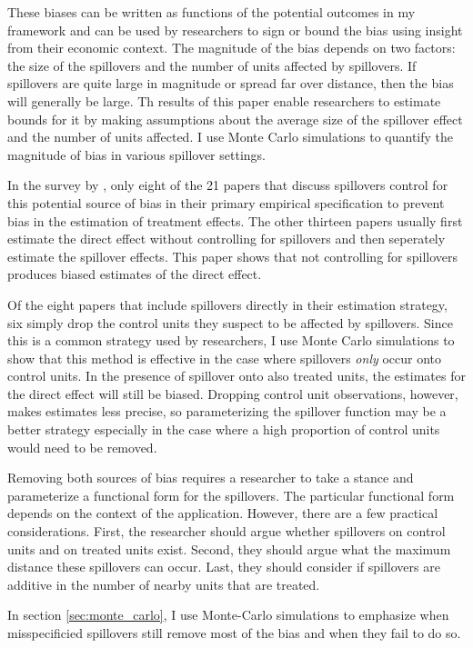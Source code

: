 \documentclass[11pt]{article}
\begin{document}
These biases can be written as functions of the potential outcomes in my framework and can be used by researchers to sign or bound the bias using insight from their economic context. The magnitude of the bias depends on two factors: the size of the spillovers and the number of units affected by spillovers. If spillovers are quite large in magnitude or spread far over distance, then the bias will generally be large. Th results of this paper enable researchers to estimate bounds for it by making assumptions about the average size of the spillover effect and the number of units affected. I use Monte Carlo simulations to quantify the magnitude of bias in various spillover settings.

In the survey by \citet{Berg_Streitz_2019}, only eight of the 21 papers that discuss spillovers control for this potential source of bias in their primary empirical specification to prevent bias in the estimation of treatment effects. The other thirteen papers usually first estimate the direct effect without controlling for spillovers and then seperately estimate the spillover effects. This paper shows that not controlling for spillovers produces biased estimates of the direct effect. 

Of the eight papers that include spillovers directly in their estimation strategy, six simply drop the control units they suspect to be affected by spillovers. Since this is a common strategy used by researchers, I use Monte Carlo simulations to show that this method is effective in the case where spillovers \textit{only} occur onto control units. In the presence of spillover onto also treated units, the estimates for the direct effect will still be biased. Dropping control unit observations, however, makes estimates less precise, so parameterizing the spillover function may be a better strategy especially in the case where a high proportion of control units would need to be removed.

Removing both sources of bias requires a researcher to take a stance and parameterize a functional form for the spillovers. The particular functional form depends on the context of the application. However, there are a few practical considerations. First, the researcher should argue whether spillovers on control units and on treated units exist. Second, they should argue what the maximum distance these spillovers can occur. Last, they should consider if spillovers are additive in the number of nearby units that are treated. 

In section \ref{sec:monte_carlo}, I use Monte-Carlo simulations to emphasize when misspecificied spillovers still remove most of the bias and when they fail to do so. 
\end{document}

